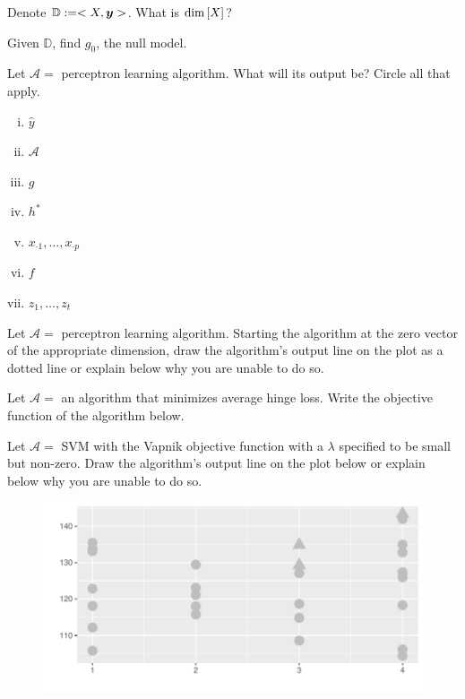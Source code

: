 \documentclass[12pt]{article}
\begin{document}

 Denote $\mathbb{D} := <X,\boldsymbol{y}>$. What is $\dim\left[X\right]$?

 Given $\mathbb{D}$, find $g_0$, the null model.




 Let $\mathcal{A} = $ perceptron learning algorithm. What will its output be? Circle all that apply.

\begin{enumerate}[i)]
\item $\hat{y}$
\item $\mathcal{A}$
\item $g$
\item $h^*$
\item $x_{\cdot 1}, \ldots, x_{\cdot p}$
\item $f$
\item $z_1, \ldots, z_t$
\end{enumerate}

 Let $\mathcal{A} = $ perceptron learning algorithm. Starting the algorithm at the zero vector of the appropriate dimension, draw the algorithm's output line on the plot as a dotted line or explain below why you are unable to do so.


 Let $\mathcal{A} = $ an algorithm that minimizes average hinge loss. Write the objective function of the algorithm below.

 Let $\mathcal{A} = $  SVM with the Vapnik objective function with a $\lambda$ specified to be small but non-zero. Draw the algorithm's output line on the plot below or explain below why you are unable to do so.


\begin{figure}[htp]
\centering
\includegraphics[width=6in]{nonlinsep_trace}
\end{figure}
\end{document}
